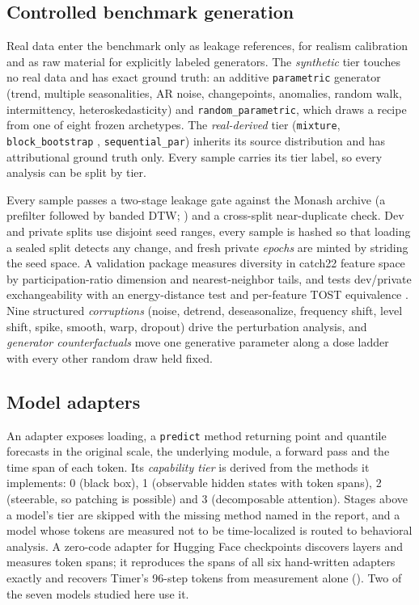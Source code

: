 \subsection{Controlled benchmark generation}
\label{sec:benchmark}
\label{sec:layout}

Real data enter the benchmark only as leakage references, for realism calibration and as raw material for explicitly
labeled generators. The \emph{synthetic} tier touches no real data and has exact ground truth: an additive
\texttt{parametric} generator (trend, multiple seasonalities, AR noise, changepoints, anomalies, random walk,
intermittency, heteroskedasticity) and \texttt{random\_parametric}, which draws a recipe from one of eight frozen
archetypes. The \emph{real-derived} tier (\texttt{mixture}, \texttt{block\_bootstrap} \citep{kunsch1989block},
\texttt{sequential\_par}) inherits its source distribution and has attributional ground truth only. Every sample carries
its tier label, so every analysis can be split by tier.

Every sample passes a two-stage leakage gate against the Monash archive \citep{godahewa2021monash} (a prefilter followed
by banded DTW; \citealp{sakoe1978dtw}) and a cross-split near-duplicate check. Dev and private splits use disjoint seed
ranges, every sample is hashed so that loading a sealed split detects any change, and fresh private \emph{epochs} are
minted by striding the seed space. A validation package measures diversity in catch22 feature space
\citep{lubba2019catch22} by participation-ratio dimension \citep{gao2017pr} and nearest-neighbor tails, and tests dev/private
exchangeability with an energy-distance test \citep{szekely2013energy} and per-feature TOST equivalence
\citep{schuirmann1987tost}. Nine structured \emph{corruptions} (noise, detrend, deseasonalize, frequency shift, level
shift, spike, smooth, warp, dropout) drive the perturbation analysis, and \emph{generator counterfactuals} move one
generative parameter along a dose ladder with every other random draw held fixed.

\subsection{Model adapters}
\label{sec:adapters}

An adapter exposes loading, a \texttt{predict} method returning point and quantile forecasts in the original scale, the
underlying module, a forward pass and the time span of each token. Its \emph{capability tier} is derived from the methods
it implements: 0 (black box), 1 (observable hidden states with token spans), 2 (steerable, so patching is possible) and 3
(decomposable attention). Stages above a model's tier are skipped with the missing method named in the report, and a
model whose tokens are measured not to be time-localized is routed to behavioral analysis. A zero-code adapter for
Hugging Face checkpoints discovers layers and measures token spans; it reproduces the spans of all six hand-written
adapters exactly and recovers Timer's 96-step tokens from measurement alone (). Two of the seven models
studied here use it.

